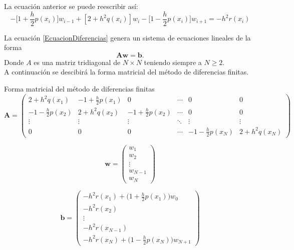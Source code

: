 \begin{frame}
La ecuación anterior se puede reescribir así:
\begin{equation}
-\bigg[1+\frac{h}{2}p(x_i) \bigg]w_{i-1}+[2+h^2q(x_i)]w_{i}-\bigg[ 1-\frac{h}{2} p(x_{i}) \bigg]w_{i+1}=-h^2r(x_i)
\label{EcuacionDiferencias}
\end{equation}

\vspace{1cm}
La ecuación \eqref{EcuacionDiferencias} genera un sistema de ecuaciones lineales de la forma 
$$\mathbf{Aw=b}.$$
Donde $A$ es una matriz tridiagonal de $N\times N$ teniendo siempre a $N\geq 2$.\\
\vspace{1cm}
A continuación se descibirá la forma matricial del método de diferencias finitas. 
\end{frame}


\begin{frame}{Forma matricial del método de diferencias finitas}
\scriptsize
\begin{equation}
\mathbf{A}=\begin{pmatrix}
2+h^2q(x_1) & -1+\frac{h}{2}p(x_1) & 0 & \cdots  &0 & 0\\
-1-\frac{h}{2}p(x_2) & 2+h^2q(x_2) & -1+\frac{h}{2}p(x_2) & \cdots & 0 & 0\\
\vdots & \vdots &\vdots & \ddots & \vdots & \vdots\\
0 & 0 & 0& \cdots & -1-\frac{h}{2}p(x_N)& 2+h^2q(x_N)
\end{pmatrix}
\end{equation}

\begin{displaymath}
\mathbf{w}=\begin{pmatrix}
w_1\\
w_2\\
\vdots\\
w_{N-1}\\
w_{N}
\end{pmatrix}
\end{displaymath}

\begin{displaymath}
\mathbf{b}=\begin{pmatrix}
-h^2r(x_1) + \bigg(1+\frac{h}{2}p(x_1)\bigg)w_0\\
-h^2r(x_2)\\
\vdots\\
-h^2r(x_{N-1})\\
-h^2r(x_N) + \bigg(1-\frac{h}{2}p(x_N)\bigg)w_{N+1}
\end{pmatrix}
\end{displaymath}
\end{frame}

